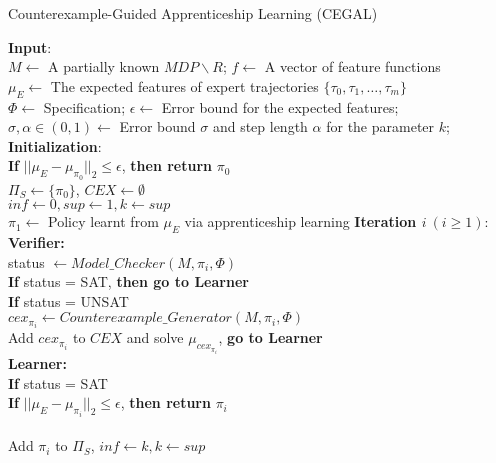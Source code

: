 \begin{algorithm}[htb]
\caption{Counterexample-Guided Apprenticeship Learning (CEGAL)}
\begin{algorithmic}[1]
\State \textbf{Input}:
\\\qquad $M\gets$ A partially known $MDP\backslash R$; $f\gets$ A vector of feature functions
\\\qquad $\mu_E\gets$ The expected features of expert trajectories $\{\tau_0, \tau_1, \ldots,\tau_m\}$
\\\qquad $\Phi\gets$ Specification; $\epsilon\gets$ Error bound for the expected features;
\\\qquad $\sigma, \alpha\in(0, 1)\gets$ Error bound $\sigma$ and step length $\alpha$ for the parameter $k$; 
\State \textbf{Initialization}:
\\\qquad \textbf{If} $||\mu_E-\mu_{\pi_0}||_2\leq \epsilon$, {\bf then return} $\pi_0$ 
\\\qquad $\Pi_S\leftarrow\{\pi_0\}$, $CEX\leftarrow\emptyset$ 
\\\qquad $inf\leftarrow0, sup\leftarrow1, k\leftarrow sup$ 
\\\qquad $\pi_1\leftarrow$ Policy learnt from $\mu_E$ via apprenticeship learning
\State \textbf{Iteration $i\ (i\geq 1)$}:
\\\qquad\textbf{Verifier:}
\\\qquad\qquad status $\gets Model\_Checker(M,\pi_i, \Phi)$
\\\qquad\qquad \textbf{If} status = SAT, \textbf{then go to Learner}
\\\qquad\qquad \textbf{If} status = UNSAT
\\\qquad\qquad\qquad $cex_{\pi_i}\gets Counterexample\_Generator(M,\pi_i,\Phi)$
\\\qquad\qquad\qquad Add $cex_{\pi_i}$ to $CEX$ and solve $\mu_{cex_{\pi_i}}$, \textbf{go to Learner} 
\\\qquad\textbf{Learner:}
\\\qquad\qquad \textbf{If} status = SAT
\\\qquad\qquad\qquad \textbf{If} $||\mu_E-\mu_{\pi_i}||_2\leq \epsilon$, {\bf then return} $\pi_i$
\\
\\\qquad\qquad\qquad Add $\pi_i$ to $\Pi_S$, $inf \leftarrow k, k \leftarrow sup$

\end{algorithmic}
\end{algorithm}
